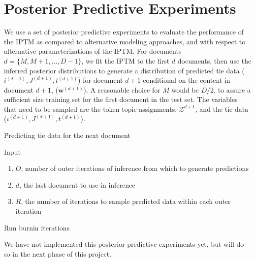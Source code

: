 \documentclass[a4paper]{article}
\begin{document}
     \section{Posterior Predictive Experiments} \label{sec:PosteriorPredictive}
 We use a set of posterior predictive experiments to evaluate the performance of the IPTM as compared to alternative modeling approaches, and with respect to alternative parameterizations of the IPTM. For documents $d=\{M,M+1,\hdots,D-1\}$, we fit the IPTM to the first $d$ documents, then use the inferred posterior distributions to generate a distribution of predicted tie data ($i^{(d+1)}, J^{(d+1)}, t^{(d+1)}$) for document $d+1$ conditional on the content in document $d+1$, ($\boldsymbol{w}^{(d+1)}$).  A reasonable choice for $M$ would be $D/2$, to assure a sufficient size training set for the first document in the test set. The variables that need to be sampled are the token topic assignments, $\mathcal{Z}^{d+1}$, and the tie data ($i^{(d+1)}, J^{(d+1)}, t^{(d+1)}$). 
 
 \begin{algorithm}[H]
	\SetAlgoLined
	\caption{Predicting tie data for the next document}
	
	Input
	\begin{enumerate}
	\item $O$, number of outer iterations of inference from which to generate predictions
	\item $d$, the last document to use in inference
	\item $R$, the number of iterations to sample predicted data within each outer iteration
	\end{enumerate}
	Run burnin iterations\\
\end{algorithm}
We have not implemented this posterior predictive experiments yet, but will do so in the next phase of this project.
\end{document}
